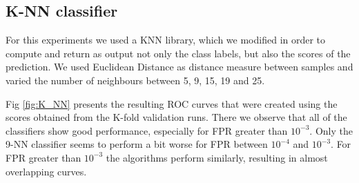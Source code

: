 \subsection{K-NN classifier}
\noindent For this experiments we used a KNN library, which we modified in order to compute and return as output not only the class labels, but also the scores of the prediction.
We used Euclidean Distance as distance measure between samples and varied the number of neighbours between 5, 9, 15, 19 and 25. 

\noindent Fig \ref{fig:K_NN} presents the resulting ROC curves that were created using the scores obtained from the K-fold validation runs. There we observe that all of the classifiers show good performance, especially for FPR greater than $10^{-3}$. Only the 9-NN classifier seems to perform a bit worse for FPR between $10^{-4}$ and $10^{-3}$. For FPR greater than  $10^{-3}$
the algorithms perform similarly, resulting in almost overlapping curves.

